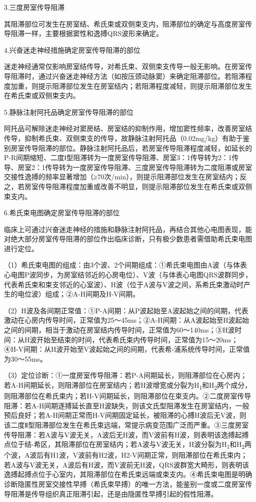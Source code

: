 3.三度房室传导阻滞

其阻滞部位可发生在房室结、希氏束或双侧束支内，阻滞部位的确定与高度房室传导阻滞一样，主要根据窦性和逸搏QRS波形来确定。

4.兴奋迷走神经措施确定房室传导阻滞的部位

迷走神经通常仅影响房室结传导，对希氏束、双侧束支传导一般无影响。在房室传导阻滞时，通过兴奋迷走神经方法（如按压颈动脉窦）来确定阻滞部位。若阻滞程度加重，则提示阻滞部位发生在房室结内；若阻滞程度减轻，则提示阻滞部位发生在希氏束或双侧束支内。

5.静脉注射阿托品确定房室传导阻滞的部位

阿托品可解除迷走神经对窦房结、房室结的抑制作用，增加窦性频率，改善房室结传导，抑制希氏束、双侧束支的传导，故静脉注射阿托品（0.02mg/kg）有助于鉴别房室传导阻滞的部位。静脉注射阿托品后，若房室传导阻滞程度减轻，如延长的P-R间期缩短、二度Ⅰ型阻滞转为一度房室传导阻滞、房室3：1传导转为2：1传导、房室2：1传导转为一度房室传导阻滞、三度房室传导阻滞转为二度阻滞或房室交接性逸搏的频率显著增加（≥70次/min），则提示阻滞部位发生在房室结内；反之，若房室传导阻滞程度加重或改善不明显，则提示阻滞部位发生在希氏束或双侧束支内。

6.希氏束电图确定房室传导阻滞的部位

临床上可通过兴奋迷走神经的措施和静脉注射阿托品，再结合其他心电图表现，能对绝大部分房室传导阻滞的部位作出临床诊断，只有极少数患者需借助希氏束电图进行定位。

（1）希氏束电图的组成：由3个波、2个间期组成：①希氏束电图由A波（与体表心电图P波同步，为房室结邻近的心房电位）、V波（与体表心电图QRS波群同步，代表希氏束和束支邻近的心室波）、H波（位于A波与V波之间，系希氏束激动时产生的电位波）组成；②A-H间期及H-V间期。

（2）H波及各间期正常值：①P-A间期：从P波起始至A波起始之间的间期，代表激动在心房内传导时间，正常值为25～45ms；②A-H间期：从A波起始至H波起始之间的间期，相当于激动在房室结内传导时间，正常值为60～140ms；③H波时间：从H波开始至结束的时间，代表希氏束内传导时间，正常值为15～20ms；④H-V间期：从H波开始至V波起始之间的间期，代表希-浦系统传导时间，正常值为30～55ms。

（3）定位诊断：①一度房室传导阻滞：若P-A间期延长，则阻滞部位在心房内；若A-H间期延长，则阻滞部位在房室结内；若H波增宽或分裂为H\textsubscript{1}和H\textsubscript{2}两个成分，则阻滞部位在希氏束内；若H-V间期延长，则阻滞部位在束支内。②二度房室传导阻滞：若A-H间期逐搏延长直至H波缺失，则该文氏型阻滞发生在房室结内，一般预后良好；若A-H间期正常而H-V间期固定延长，被阻滞的心搏H波后无V波，则该二度Ⅱ型阻滞部位发生在希氏束远端，常提示病变范围广泛而严重。③三度房室传导阻滞：若A波与V波无关，A波后无H波，而V波前有H波，则表明该逸搏起搏点位于结-希区，其阻滞部位在房室结内；若A波与V波无关，H波分裂为H\textsubscript{1}和H\textsubscript{2}两个波，A波后有H1波，V波前有H2波，H2-V间期正常，则阻滞部位在希氏束内；若A波与V波无关，A波后有H波，而V波前无H波，QRS波群宽大畸形，则表明该逸搏起搏点位于心室内，其阻滞部位在希氏束远端或束支内。④希氏束电图是明确诊断隐匿性房室交接性早搏（希氏束早搏）的唯一方法，能鉴别一度或二度房室传导阻滞是传导组织真正阻滞引起，还是由隐匿性早搏引起的假性阻滞。


